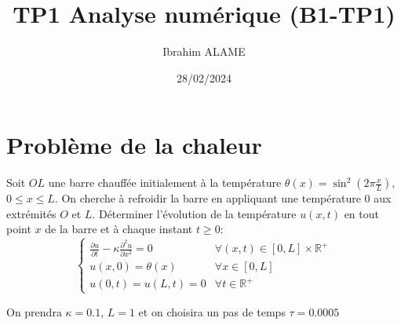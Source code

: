 \documentclass{article}
\title{TP1 Analyse numérique (B1-TP1)}
\author{Ibrahim ALAME}
\date{28/02/2024}
\begin{document}
\maketitle

\section{Problème de la chaleur}  
 Soit $OL$ une barre chauffée initialement à la température $\theta(x)=\sin^2(2\pi \frac xL)$, $0\leq x\leq L$. On cherche à refroidir la barre en appliquant une température $0$ aux extrémités $O$ et $L$. Déterminer l'évolution de la température $u(x,t)$ en tout point $x$ de la barre et à chaque instant $t\geq 0$:
 \[\left\{\begin{array}{ll}
 \frac{\partial u}{\partial t}-\kappa \frac{\partial^2 u}{\partial x^2}=0 & \forall (x,t)\in [0,L]\times\mathbb{R}^+\\
 u(x,0)=\theta(x) & \forall x \in [0,L]\\
 u(0,t)=u(L,t)=0 & \forall t\in \mathbb{R}^+
 \end{array}\right.\]
\begin{center}
 \end{center}
On prendra $\kappa=0.1$, $L=1$ et on choisira un pas de temps $\tau=0.0005$
\end{document}
